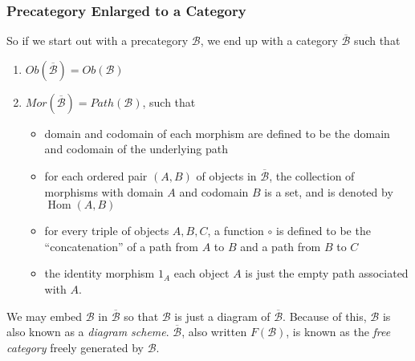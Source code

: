 \documentclass[12pt]{article}
\begin{document}
\subsubsection*{Precategory Enlarged to a Category}
So if we start out with a precategory $\mathcal{B}$, we end up with a category $\mathcal{\overline{B}}$ such that 
\begin{enumerate}
\item $Ob(\mathcal{\overline{B}})=Ob(\mathcal{B})$
\item $Mor(\mathcal{\overline{B}})=Path(\mathcal{B})$, such that
\begin{itemize}
\item domain and codomain of each morphism are defined to be the domain and codomain of the underlying path
\item for each ordered pair $(A,B)$ of objects in $\mathcal{\overline{B}}$, the collection of morphisms with domain $A$ and codomain $B$ is a set, and is denoted by $\operatorname{Hom}(A,B)$
\item for every triple of objects $A,B,C$, a function $\circ$ is defined to be the ``concatenation'' of a path from $A$ to $B$ and a path from $B$ to $C$
\item the identity morphism $1_A$ each object $A$ is just the empty path associated with $A$.
\end{itemize}
\end{enumerate}
We may embed $\mathcal{B}$ in $\mathcal{\overline{B}}$ so that $\mathcal{B}$ is just a diagram of $\mathcal{\overline{B}}$.  Because of this, $\mathcal{B}$ is also known as a \emph{diagram scheme}.  $\mathcal{\overline{B}}$, also written $F(\mathcal{B})$, is known as the \emph{free category} freely generated by $\mathcal{B}$.
\end{document}
